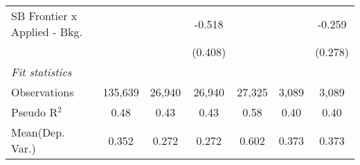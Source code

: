 \begin{tabular}{lcccccc}
   SB Frontier x Applied - Bkg.   &               &         & -0.518       &               &              & -0.259\\   
                                  &               &         & (0.408)      &               &              & (0.278)\\   
   \midrule
   \emph{Fit statistics}\\
   Observations                   & 135,639       & 26,940  & 26,940       & 27,325        & 3,089        & 3,089\\  
   Pseudo R$^2$                   & 0.48          & 0.43    & 0.43         & 0.58          & 0.40         & 0.40\\  
Mean(Dep. Var.) & 0.352 & 0.272 & 0.272 & 0.602 & 0.373 & 0.373 \\
   

\end{tabular}
